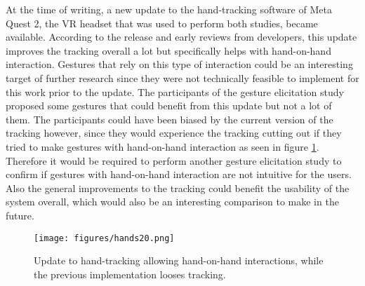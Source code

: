At the time of writing, a new update to the hand-tracking software of Meta Quest 2, the VR headset that was used to perform both studies, became available. According to the release \cite{handstworelease} and early reviews from developers, this update improves the tracking overall a lot but specifically helps with hand-on-hand interaction. Gestures that rely on this type of interaction could be an interesting target of further research since they were not technically feasible to implement for this work prior to the update. The participants of the gesture elicitation study proposed some gestures that could benefit from this update but not a lot of them. The participants could have been biased  by the current version of the tracking however, since they would experience the tracking cutting out if they tried to make gestures with hand-on-hand interaction as seen in figure \ref{fig:hands20}. Therefore it would be required to perform another gesture elicitation study to confirm if gestures with hand-on-hand interaction are not intuitive for the users. Also the general improvements to the tracking could benefit the usability of the system overall, which would also be an interesting comparison to make in the future. 

\begin{figure}[!ht]
    \centering
    \texttt{[image: figures/hands20.png]}
    \caption{Update to hand-tracking allowing hand-on-hand interactions, while the previous implementation looses tracking.}
    \label{fig:hands20}
\end{figure}
